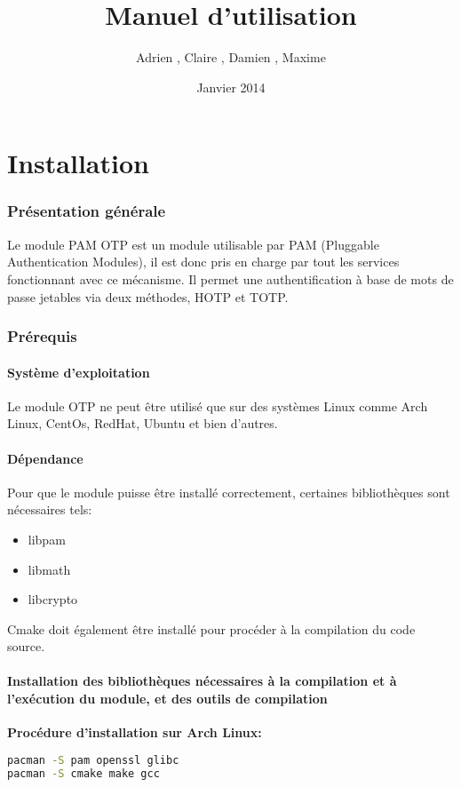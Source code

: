 \documentclass{"../../../res/univ-projet"}
\title{Manuel d'utilisation}
\author{Adrien \bsc{Smondack}, Claire \bsc{Hardouin}, Damien \bsc{Picard}, Maxime \bsc{Michotte}}
\date{Janvier 2014}
\begin{document}
\maketitle
\tableofcontents

\newpage

\part{Installation}
\section{Présentation générale}
Le module PAM OTP est un module utilisable par PAM (Pluggable Authentication Modules), 
il est donc pris en charge par tout les services fonctionnant avec ce mécanisme. Il permet 
une authentification à base de mots de passe jetables via deux méthodes, HOTP et TOTP.

\label{prereq}
\section{Prérequis}
\subsection{Système d'exploitation}
Le module OTP ne peut être utilisé que sur des systèmes Linux comme Arch Linux, 
CentOs, RedHat, Ubuntu et bien d'autres.

\subsection{Dépendance}
Pour que le module puisse être installé correctement, certaines bibliothèques 
sont nécessaires tels:
\begin{itemize}
\item libpam
\item libmath
\item libcrypto
\end{itemize}
Cmake doit également être installé pour procéder à la compilation du code source.
\newline

\subsection{Installation des bibliothèques nécessaires à la compilation et à l'exécution du module, et des outils de compilation}
\textbf{Procédure d'installation sur Arch Linux:}\\
\begin{lstlisting}[language=bash, backgroundcolor=\color{black}, basicstyle=\color{white}]
pacman -S pam openssl glibc
pacman -S cmake make gcc
\end{lstlisting}
\end{document}
